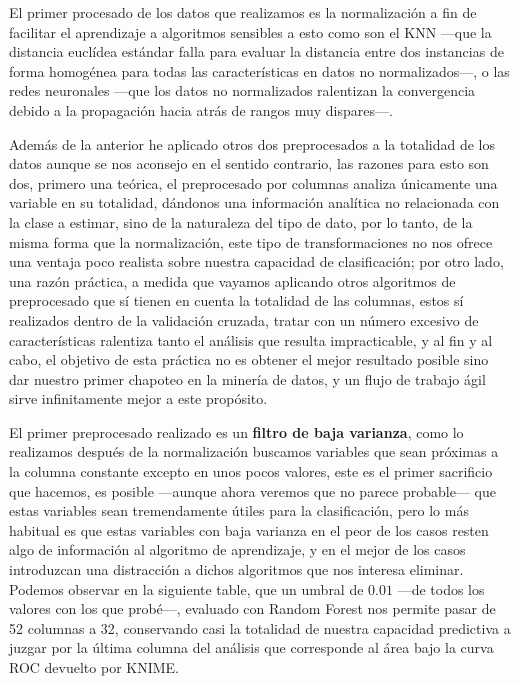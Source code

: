 \documentclass{article}
\begin{document}
El primer procesado de los datos que realizamos es la normalización a fin de facilitar el aprendizaje a algoritmos sensibles a esto como son el KNN ---que la distancia euclídea estándar falla para evaluar la distancia entre dos instancias de forma homogénea para todas las características en datos no normalizados---, o las redes neuronales ---que los datos no normalizados ralentizan la convergencia debido a la propagación hacia atrás de rangos muy dispares---. 

Además de la anterior he aplicado otros dos preprocesados a la totalidad de los datos aunque se nos aconsejo en el sentido contrario, las razones para esto son dos, primero una teórica, el preprocesado por columnas analiza únicamente una variable en su totalidad, dándonos una información analítica no relacionada con la clase a estimar, sino de la naturaleza del tipo de dato, por lo tanto, de la misma forma que la normalización, este tipo de transformaciones no nos ofrece una ventaja poco realista sobre nuestra capacidad de clasificación; por otro lado, una razón práctica, a medida que vayamos aplicando otros algoritmos de preprocesado que sí tienen en cuenta la totalidad de las columnas, estos sí realizados dentro de la validación cruzada, tratar con un número excesivo de características ralentiza tanto el análisis que resulta impracticable, y al fin y al cabo, el objetivo de esta práctica no es obtener el mejor resultado posible sino dar nuestro primer chapoteo en la minería de datos, y un flujo de trabajo ágil sirve infinitamente mejor a este propósito.

El primer preprocesado realizado es un \textbf{filtro de baja varianza}, como lo realizamos después de la normalización buscamos variables que sean próximas a la columna constante excepto en unos pocos valores, este es el primer sacrificio que hacemos, es posible ---aunque ahora veremos que no parece probable--- que estas variables sean tremendamente útiles para la clasificación, pero lo más habitual es que estas variables con baja varianza en el peor de los casos resten algo de información al algoritmo de aprendizaje, y en el mejor de los casos introduzcan una distracción a dichos algoritmos que nos interesa eliminar. Podemos observar en la siguiente table, que un umbral de $0.01$ ---de todos los valores con los que probé---, evaluado con Random Forest nos permite pasar de 52 columnas a 32, conservando casi la totalidad de nuestra capacidad predictiva a juzgar por la última columna del análisis que corresponde al área bajo la curva ROC devuelto por KNIME.
\end{document}

